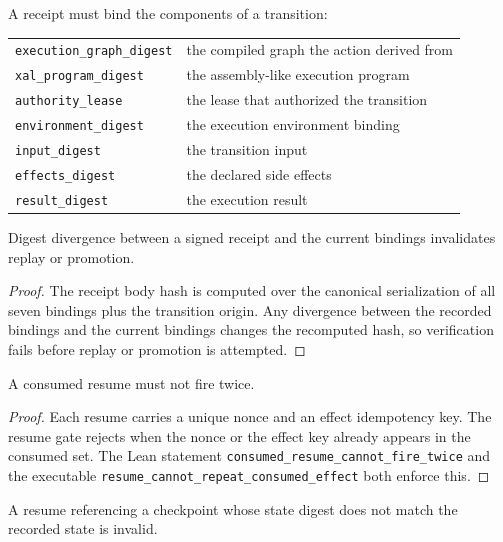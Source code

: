 A receipt must bind the components of a transition:

\begin{center}
\begin{tabular}{ll}
\texttt{execution\_graph\_digest} & the compiled graph the action derived from \\
\texttt{xal\_program\_digest} & the assembly-like execution program \\
\texttt{authority\_lease} & the lease that authorized the transition \\
\texttt{environment\_digest} & the execution environment binding \\
\texttt{input\_digest} & the transition input \\
\texttt{effects\_digest} & the declared side effects \\
\texttt{result\_digest} & the execution result \\
\end{tabular}
\end{center}

\begin{theorem}\label{thm:divergence}
Digest divergence between a signed receipt and the current bindings
invalidates replay or promotion.
\end{theorem}

\begin{proof}
The receipt body hash is computed over the canonical serialization of all
seven bindings plus the transition origin. Any divergence between the
recorded bindings and the current bindings changes the recomputed hash,
so verification fails before replay or promotion is attempted.
\end{proof}

\begin{theorem}\label{thm:resume}
A consumed resume must not fire twice.
\end{theorem}

\begin{proof}
Each resume carries a unique nonce and an effect idempotency key. The
resume gate rejects when the nonce or the effect key already appears in
the consumed set. The Lean statement
\texttt{consumed\_resume\_cannot\_fire\_twice} and the executable
\texttt{resume\_cannot\_repeat\_consumed\_effect} both enforce this.
\end{proof}

\begin{theorem}\label{thm:checkpoint}
A resume referencing a checkpoint whose state digest does not match the
recorded state is invalid.
\end{theorem}

